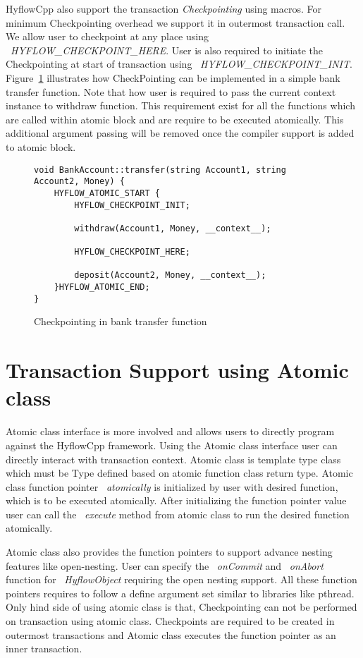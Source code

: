 \documentclass[12pt,english]{report}
\begin{document}
HyflowCpp also support the transaction \emph{Checkpointing} using macros. For minimum Checkpointing overhead we support it in outermost transaction call. We allow user to checkpoint at any place using ~\emph{HYFLOW{\_}CHECKPOINT{\_}HERE}. User is also required to initiate the Checkpointing at start of transaction using ~\emph{HYFLOW{\_}CHECKPOINT{\_}INIT}. Figure~\ref{Fig:bankCP} illustrates how CheckPointing can be implemented in a simple bank transfer function. Note that how user is required to pass the current context instance to withdraw function. This requirement exist for all the functions which are called within atomic block and are require to be executed atomically. This additional argument passing will be removed once the compiler support is added to atomic block. 

\begin{figure}
\begin{minipage}[b]{0.9\linewidth}\centering
\begin{lstlisting}
void BankAccount::transfer(string Account1, string Account2, Money) {
	HYFLOW_ATOMIC_START {
		HYFLOW_CHECKPOINT_INIT;

		withdraw(Account1, Money, __context__);

		HYFLOW_CHECKPOINT_HERE;
	
		deposit(Account2, Money, __context__);
	}HYFLOW_ATOMIC_END;
}
\end{lstlisting}
\end{minipage}
\caption{Checkpointing in bank transfer function}
\label{Fig:bankCP}
\end{figure}

\section{Transaction Support using Atomic class}

Atomic class interface is more involved and allows users to directly program against the HyflowCpp framework. Using the Atomic class interface user can directly interact with transaction context. Atomic class is template type class which must be Type defined based on atomic function class return type. Atomic class function pointer ~\emph{atomically} is initialized by user with desired function, which is to be executed atomically. After initializing the function pointer value user can call the ~\emph{execute} method from atomic class to run the desired function atomically.

Atomic class also provides the function pointers to support advance nesting features like open-nesting. User can specify the ~\emph{onCommit} and ~\emph{onAbort} function for  ~\emph{HyflowObject} requiring the open nesting support. All these function pointers requires to follow a define argument set similar to libraries like pthread. Only hind side of using atomic class is that, Checkpointing can not be performed on transaction using atomic class. Checkpoints are required to be created in outermost transactions and Atomic class executes the function pointer as an inner transaction. 
\end{document}
